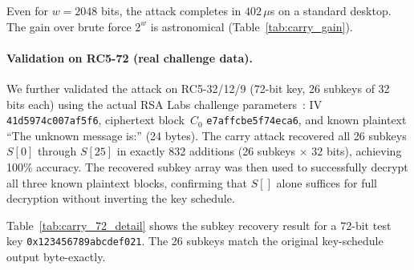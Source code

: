 \documentclass{sbc2023-pdf}%
\theoremstyle{plain}
\begin{document}
Even for \(w=2048\) bits, the attack completes in \(402\,\mu\)s on a standard desktop. The gain over brute force \(2^w\) is astronomical (Table~\ref{tab:carry_gain}).

\begin{table}[htbp]
\centering
\caption{Brute-force comparison for each word size.}
\label{tab:carry_gain}
\end{table}

\paragraph{Validation on RC5-72 (real challenge data).}
We further validated the attack on RC5-32/12/9 (72-bit key, 26 subkeys of 32 bits each) using the actual RSA Labs challenge parameters~\citep{rsalabs2002}: IV \texttt{41d5974c007af5f6}, ciphertext block~\(C_0\) \texttt{e7affcbe5f74eca6}, and known plaintext ``The unknown message is:'' (24 bytes). The carry attack recovered all 26 subkeys \(S[0]\) through \(S[25]\) in exactly 832 additions (26 subkeys \(\times\) 32 bits), achieving 100\% accuracy. The recovered subkey array was then used to successfully decrypt all three known plaintext blocks, confirming that \(S[]\) alone suffices for full decryption without inverting the key schedule.

Table~\ref{tab:carry_72_detail} shows the subkey recovery result for a 72-bit test key \texttt{0x123456789abcdef021}. The 26 subkeys match the original key-schedule output byte-exactly.

\begin{table}[htbp]
\centering
\caption{Carry attack validation on RC5-72: 26/26 subkeys recovered.}
\label{tab:carry_72_detail}
\end{table}
\end{document}
